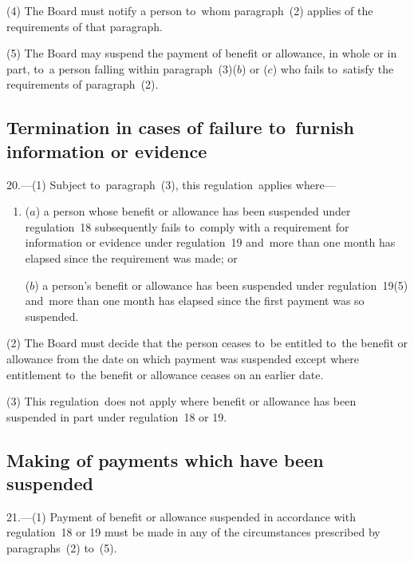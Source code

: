 \documentclass[12pt,a4paper]{article}
\begin{document}
(4) The Board must notify a person to~whom paragraph~(2) applies of the requirements of that paragraph.

(5) The Board may suspend the payment of benefit or allowance, in whole or in part, to~a person falling within paragraph~(3)($b$)  or ($c$)  who fails to~satisfy the requirements of paragraph~(2).

\subsection[20. Termination in cases of failure to~furnish information or evidence]{Termination in cases of failure to~furnish information or evidence}

20.---(1)  Subject to~paragraph~(3), this regulation~applies where—
\begin{enumerate}\item[]
($a$) a person whose benefit or allowance has been suspended under regulation~18 subsequently fails to~comply with a requirement for information or evidence under regulation~19 and~more than one month has elapsed since the requirement was made; or

($b$) a person’s benefit or allowance has been suspended under regulation~19(5) and~more than one month has elapsed since the first payment was so suspended.
\end{enumerate}

(2) The Board must decide that the person ceases to~be entitled to~the benefit or allowance from the date on which payment was suspended except where entitlement to~the benefit or allowance ceases on an earlier date.

(3) This regulation~does not apply where benefit or allowance has been suspended in part under regulation~18 or 19.

\subsection[21. Making of payments which have been suspended]{Making of payments which have been suspended}

21.---(1)  Payment of benefit or allowance suspended in accordance with regulation~18 or 19 must be made in any of the circumstances prescribed by paragraphs~(2) to~(5).
\end{document}
